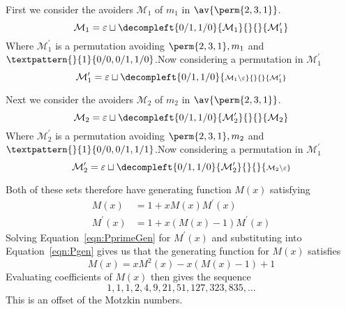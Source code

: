 \begin{frame}
  First we consider the avoiders \(\mathcal{M}_1\) of \(m_1\) in \(\av{\perm{2,3,1}}\).
  \begin{equation*}
    \mathcal{M}_1 = \varepsilon \sqcup
    \decompleft{0/1,1/0}{\mathcal{M}_1}{}{}{\mathcal{M}^\prime_1}
\end{equation*}
Where \(\mathcal{M}^\prime_1\) is a permutation avoiding \(\perm{2,3,1}, m_1\)
and \(\textpattern{}{1}{0/0,0/1,1/0}\).\pause Now considering a permutation in \(\mathcal{M}^\prime_1\)
\begin{equation*}
    \mathcal{M}^\prime_1 = \varepsilon \sqcup
    \decompleft{0/1,1/0}{\scriptstyle \mathcal{M}_1\setminus\varepsilon}{}{}{\mathcal{M}^\prime_1}
\end{equation*}
\end{frame}

\begin{frame}
  Next we consider the avoiders \(\mathcal{M}_2\) of \(m_2\) in \(\av{\perm{2,3,1}}\).
  \begin{equation*}
    \mathcal{M}_2 = \varepsilon \sqcup
    \decompleft{0/1,1/0}{\mathcal{M}^\prime_2}{}{}{\mathcal{M}_2}
\end{equation*}
Where \(\mathcal{M}^\prime_2\) is a permutation avoiding \(\perm{2,3,1}, m_2\)
and \(\textpattern{}{1}{0/0,0/1,1/1}\).\pause Now considering a permutation in \(\mathcal{M}^\prime_1\)
\begin{equation*}
    \mathcal{M}^\prime_2 = \varepsilon \sqcup
    \decompleft{0/1,1/0}{\mathcal{M}^\prime_2}{}{}{\scriptstyle \mathcal{M}_2\setminus\varepsilon}
\end{equation*}
\end{frame}
\begin{frame}
  Both of these sets therefore have generating function \(M(x)\) satisfying
  \begin{align}
    M(x) &= 1 + xM(x)M^\prime(x) \label{eqn:Pgen}\\
    M^\prime(x) &= 1 + x(M(x)-1)M^\prime(x)\label{eqn:PprimeGen}
 \end{align}\pause
 Solving Equation~\ref{eqn:PprimeGen} for \(M^\prime(x)\) and substituting into
Equation~\ref{eqn:Pgen} gives us that the generating function for
\(M(x)\) satisfies
\begin{equation}
    M(x) = xM^2(x) - x(M(x) - 1) + 1
\end{equation}\pause
Evaluating coefficients of \(M(x)\) then gives the sequence
\begin{equation*}
    1, 1, 1, 2, 4, 9, 21, 51, 127, 323, 835,\dotsc
\end{equation*}
This is an offset of the Motzkin numbers.
\end{frame}
